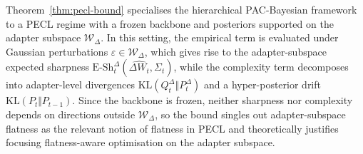 \documentclass[10pt]{article} %
\begin{document}
Theorem~\ref{thm:pecl-bound} specialises the hierarchical PAC-Bayesian framework to a PECL regime with a frozen backbone and posteriors supported on the adapter subspace $\mathcal{W}_\Delta$. In this setting, the empirical term is evaluated under Gaussian perturbations \( \varepsilon \in \mathcal W_\Delta \), which gives rise to the adapter-subspace expected sharpness \( \mathrm{E\text{-}Sh}^{\Delta}_t(\hat{\Delta W_t},\Sigma_t) \), while the complexity term decomposes into adapter-level divergences \( \mathrm{KL}(Q^\Delta_t \Vert P^\Delta_t) \) and a hyper-posterior drift \( \mathrm{KL}(P_t \Vert P_{t-1}) \). Since the backbone is frozen, neither sharpness nor complexity depends on directions outside \( \mathcal W_\Delta \), so the bound singles out adapter-subspace flatness as the relevant notion of flatness in PECL and theoretically justifies focusing flatness-aware optimisation on the adapter subspace.





\end{document}
